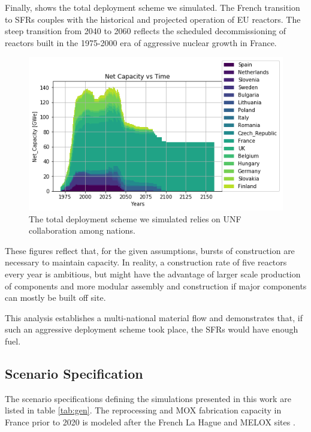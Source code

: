\documentclass{article}
\begin{document}
Finally,  shows the total deployment scheme we simulated.  
The French transition to \glspl{SFR} couples with the historical and projected 
operation of \gls{EU} reactors.  The steep transition from 2040 to 2060 
reflects the scheduled decommissioning of reactors built in the 1975-2000 era 
of aggressive nuclear growth in France.

\begin{figure}[htbp!]
    \begin{center}
        \includegraphics[scale=0.6]{./images/eu_future/onesim.png}
    \end{center}
    \caption{The total deployment scheme we simulated relies on \gls{UNF} 
    collaboration among nations.} 
    \label{fig:tot_dep}
\end{figure}

These figures reflect that, for the given assumptions, bursts of construction
are necessary to maintain capacity.  In reality, a construction rate of five 
reactors every year is ambitious, but might have the advantage of
larger scale production of components and more modular assembly and construction if major components can mostly be built off site.

This analysis establishes a multi-national material flow and demonstrates that, if such an aggressive deployment scheme took place, the \glspl{SFR} would have enough fuel.

\subsection{Scenario Specification}

The scenario specifications defining the simulations presented in this work 
are listed in table \ref{tab:gen}.
The reprocessing and \gls{MOX} fabrication capacity in France
prior to 2020 is modeled after the 
French La Hague and MELOX sites \cite{schneider_spent_2008, hugelmann_melox_1999}.
\end{document}
